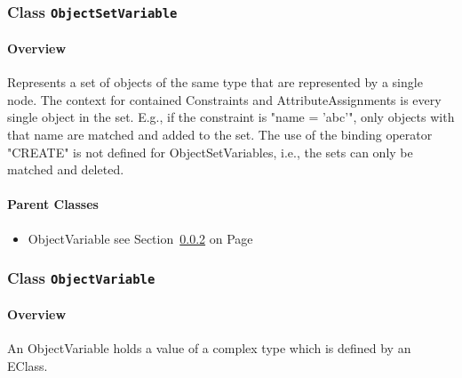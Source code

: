 \subsubsection{\Large{Class \bfseries \texttt{ObjectSetVariable}\normalfont}}
\label{cls:modeling::patterns::ObjectSetVariable} 
\paragraph{Overview}

	
			
Represents a set of objects of the same type that are represented by a single node.
The context for contained Constraints and AttributeAssignments is every single object in the set. E.g., if the constraint is "name = 'abc'", only objects with that name are matched and added to the set. The use of the binding operator "CREATE" is not defined for ObjectSetVariables, i.e., the sets can only be matched and deleted.	
		
	



\paragraph{Parent Classes}
\begin{itemize}
\item ObjectVariable see Section~\ref{cls:modeling::patterns::ObjectVariable} on Page~\pageref{cls:modeling::patterns::ObjectVariable}\end{itemize}
\subsubsection{\Large{Class \bfseries \texttt{ObjectVariable}\normalfont}}
\label{cls:modeling::patterns::ObjectVariable} 
\paragraph{Overview}

	
			
An ObjectVariable holds a value of a complex type which is defined by an EClass. 	
		
	


